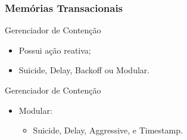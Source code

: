 \documentclass[10pt, pdf,xcolor=pdftex,dvipsnames,table]{beamer}
\begin{document}
\begin{frame} \frametitle{Memórias Transacionais}
    \begin{block}{Gerenciador de Contenção}
        \begin{itemize}
        	\item Possui ação reativa;
        	\item Suicide, Delay, Backoff ou Modular.
        \end{itemize}
    \end{block}
    \begin{block}{Gerenciador de Contenção}
        \begin{itemize}
            \item Modular:
            \begin{itemize}
    	        \item Suicide, Delay, Aggressive, e Timestamp.
            \end{itemize}
        \end{itemize}
    \end{block}
\end{frame}
\end{document}
